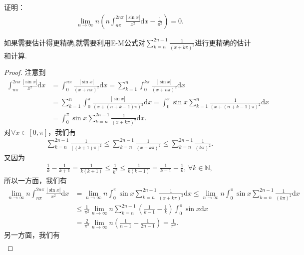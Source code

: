 \documentclass[../../main.tex]{subfiles}
\begin{document}
\begin{example}
证明：
\begin{align*}
\lim_{n \to \infty} n \left( n \int_{n\pi}^{2n\pi} \frac{|\sin x|}{x^2} \mathrm{d}x - \frac{1}{\pi^2} \right) = 0.
\end{align*}
\end{example}
\begin{note}
如果需要估计得更精确,就需要利用E-M公式对$\sum_{k=n}^{2n - 1} \frac{1}{(x + k\pi)^2}$进行更精确的估计和计算.
\end{note}
\begin{proof}
注意到
\begin{align*}
\int_{n\pi}^{2n\pi} \frac{|\sin x|}{x^2} \mathrm{d}x &= \int_0^{n\pi} \frac{|\sin x|}{(x + n\pi)^2} \mathrm{d}x = \sum_{k=1}^n \int_0^{k\pi} \frac{|\sin x|}{(x + n\pi)^2} \mathrm{d}x \\
&= \sum_{k=1}^n \int_0^{\pi} \frac{|\sin x|}{(x + (n + k - 1)\pi)^2} \mathrm{d}x = \int_0^{\pi} \sin x \sum_{k=1}^n \frac{1}{(x + (n + k - 1)\pi)^2} \mathrm{d}x \\
&= \int_0^{\pi} \sin x \sum_{k=n}^{2n - 1} \frac{1}{(x + k\pi)^2} \mathrm{d}x.
\end{align*}
对$\forall x \in [0, \pi]$，我们有
\begin{align*}
\sum_{k=n}^{2n - 1} \frac{1}{[(k + 1)\pi]^2} \leqslant  \sum_{k=n}^{2n - 1} \frac{1}{(x + k\pi)^2} \leqslant  \sum_{k=n}^{2n - 1} \frac{1}{(k\pi)^2}.
\end{align*}
又因为
\begin{align*}
\frac{1}{k} - \frac{1}{k + 1} = \frac{1}{k(k + 1)} \leqslant  \frac{1}{k^2} \leqslant  \frac{1}{k(k - 1)} = \frac{1}{k - 1} - \frac{1}{k}, \, \forall k \in \mathbb{N},
\end{align*}
所以一方面，我们有
\begin{align*}
\lim_{n \to \infty} n \int_{n\pi}^{2n\pi} \frac{|\sin x|}{x^2} \mathrm{d}x &= \lim_{n \to \infty} n \int_0^{\pi} \sin x \sum_{k=n}^{2n - 1} \frac{1}{(x + k\pi)^2} \mathrm{d}x \leqslant  \lim_{n \to \infty} n \int_0^{\pi} \sin x \sum_{k=n}^{2n - 1} \frac{1}{(k\pi)^2} \mathrm{d}x \\
&\leqslant  \frac{1}{\pi^2} \lim_{n \to \infty} n \sum_{k=n}^{2n - 1} \left( \frac{1}{k - 1} - \frac{1}{k} \right) \int_0^{\pi} \sin x \mathrm{d}x \\
&= \frac{2}{\pi^2} \lim_{n \to \infty} n \left( \frac{1}{n - 1} - \frac{1}{2n - 1} \right) = \frac{1}{\pi^2}.
\end{align*}
另一方面，我们有
\begin{align*}

\end{align*}
\end{proof}
\end{document}

